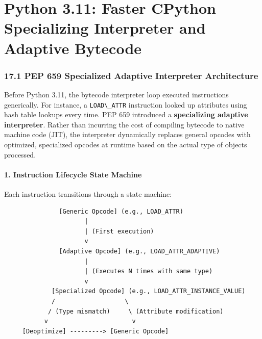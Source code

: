 \hypertarget{python-3.11-faster-cpython-specializing-interpreter-and-adaptive-bytecode}{%
\chapter{Python 3.11: Faster CPython Specializing Interpreter and
Adaptive
Bytecode}\label{python-3.11-faster-cpython-specializing-interpreter-and-adaptive-bytecode}}

\hypertarget{pep-659-specialized-adaptive-interpreter-architecture}{%
\subsection{17.1 PEP 659 Specialized Adaptive Interpreter
Architecture}\label{pep-659-specialized-adaptive-interpreter-architecture}}

Before Python 3.11, the bytecode interpreter loop executed instructions
generically. For instance, a \passthrough{\lstinline!LOAD\_ATTR!}
instruction looked up attributes using hash table lookups every time.
PEP 659 introduced a \textbf{specializing adaptive interpreter}. Rather
than incurring the cost of compiling bytecode to native machine code
(JIT), the interpreter dynamically replaces general opcodes with
optimized, specialized opcodes at runtime based on the actual type of
objects processed.

\hypertarget{instruction-lifecycle-state-machine}{%
\subsubsection{1. Instruction Lifecycle State
Machine}\label{instruction-lifecycle-state-machine}}

Each instruction transitions through a state machine:

\begin{lstlisting}
               [Generic Opcode] (e.g., LOAD_ATTR)
                      |
                      | (First execution)
                      v
               [Adaptive Opcode] (e.g., LOAD_ATTR_ADAPTIVE)
                      |
                      | (Executes N times with same type)
                      v
             [Specialized Opcode] (e.g., LOAD_ATTR_INSTANCE_VALUE)
             /                   \
            / (Type mismatch)     \ (Attribute modification)
           v                       v
     [Deoptimize] ---------> [Generic Opcode]
\end{lstlisting}

